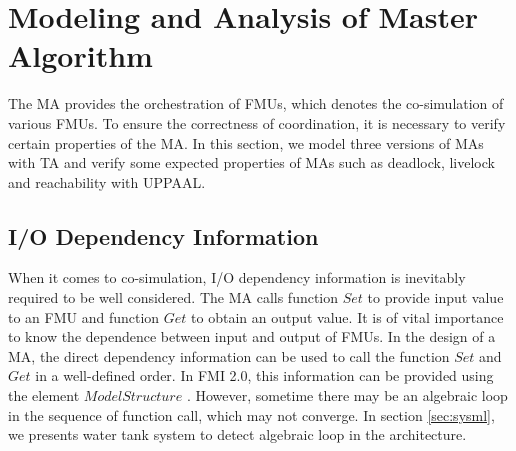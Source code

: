 \section{Modeling and Analysis of Master Algorithm}
\label{sec:ma}
The MA provides the orchestration of FMUs, which denotes the co-simulation of various FMUs. To ensure the correctness of coordination, it is necessary to verify certain properties of the MA. In this section, we model three versions of MAs with TA and verify some expected properties of MAs such as deadlock, livelock and reachability with UPPAAL.
\subsection{I/O Dependency Information}
When it comes to co-simulation, I/O dependency information \cite{BromanBGLMTW13} is inevitably required to be well considered. The MA calls function $Set$ to provide input value to an FMU and function $Get$ to obtain an output value. It is of vital importance to know the dependence between input and output of FMUs. In the design of a MA, the direct dependency information can be used to call the function $Set$ and $Get$ in a well-defined order. In FMI 2.0, this information can be provided using the element $ModelStructure$ \cite{FMI2INTRO}. However, sometime there may be an algebraic loop in the sequence of function call, which may not converge. In section \ref{sec:sysml}, we presents water tank system to detect algebraic loop in the architecture.
